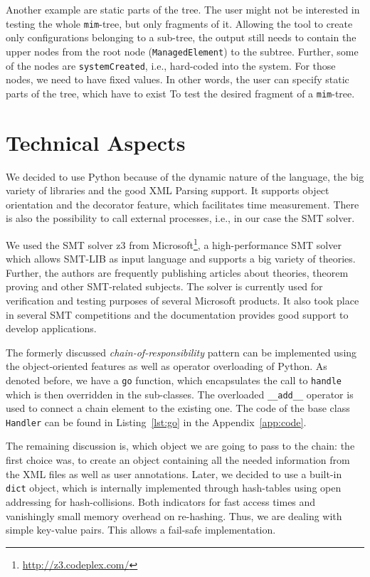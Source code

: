 Another example are static parts of the tree. The user might not be interested in testing the whole \verb|mim|-tree, but only fragments of it. Allowing the tool to create only configurations belonging to a sub-tree, the output still needs to contain the upper nodes from the root node (\verb|ManagedElement|) to the subtree. Further, some of the nodes are \verb|systemCreated|, i.e., hard-coded into the system. For those nodes, we need to have fixed values. In other words, the user can specify static parts of the tree, which have to exist To test the desired fragment of a \verb|mim|-tree.


\section{Technical Aspects}\label{sec:tech}

We decided to use Python because of the dynamic nature of the language, the big variety of libraries and the good XML Parsing support. It supports object orientation and the decorator feature, which facilitates time measurement. There is also the possibility to call external processes, i.e., in our case the SMT solver.


We used the SMT solver z3 from Microsoft\footnote{\url{http://z3.codeplex.com/}}, a high-performance SMT solver which allows SMT-LIB as input language and supports a big variety of theories. Further, the authors are frequently publishing articles about theories, theorem proving and other SMT-related subjects. The solver is currently used for verification and testing purposes of several Microsoft products. It also took place in several SMT competitions and the documentation provides good support to develop applications.

The formerly discussed \emph{chain-of-responsibility} pattern can be implemented using the object-oriented features as well as operator overloading of Python. As denoted before, we have a \verb|go| function, which encapsulates the call to \verb|handle| which is then overridden in the sub-classes. The overloaded \verb|__add__| operator is used to connect a chain element to the existing one. The code of the base class \verb|Handler| can be found in Listing~\ref{lst:go} in the Appendix~\ref{app:code}.


The remaining discussion is, which object we are going to pass to the chain: the first choice was, to create an object containing all the needed information from the XML files as well as user annotations. Later, we decided to use a built-in \verb|dict| object, which is internally implemented through hash-tables using open addressing for hash-collisions. Both indicators for fast access times and vanishingly small memory overhead on re-hashing. Thus, we are dealing with simple key-value pairs. This allows a fail-safe implementation.

